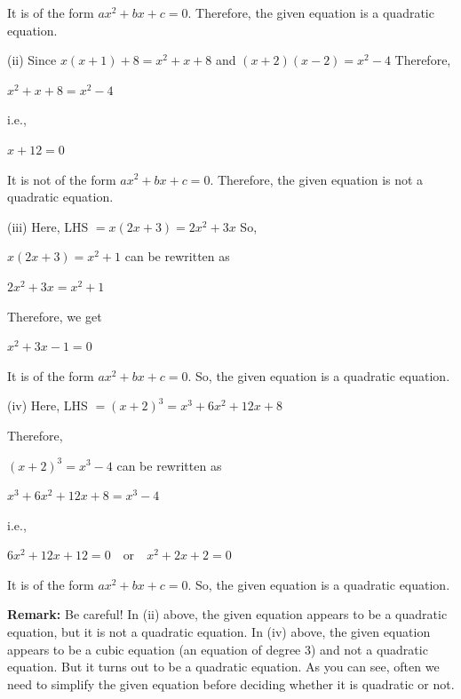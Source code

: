 \documentclass[11pt]{article}
\begin{document}
It is of the form $ax^2 + bx + c = 0$.
Therefore, the given equation is a quadratic equation.

\medskip
\noindent
(ii) Since $x(x + 1) + 8 = x^2 + x + 8$ and $(x + 2)(x - 2) = x^2 - 4$
Therefore,
\begin{center}
$x^2 + x + 8 = x^2 - 4$
\end{center}

i.e.,
\begin{center}
$x + 12 = 0$
\end{center}

It is not of the form $ax^2 + bx + c = 0$.
Therefore, the given equation is not a quadratic equation.

\medskip
\noindent
(iii) Here, \hspace{1cm} LHS $= x(2x + 3) = 2x^2 + 3x$
So,
\begin{center}
$x(2x + 3) = x^2 + 1$ can be rewritten as
\end{center}

\begin{center}
$2x^2 + 3x = x^2 + 1$
\end{center}
Therefore, we get
\begin{center}
$x^2 + 3x - 1 = 0$
\end{center}

It is of the form $ax^2 + bx + c = 0$.
So, the given equation is a quadratic equation.

\medskip
\noindent
(iv) Here, \hspace{1cm} LHS $= (x + 2)^3 = x^3 + 6x^2 + 12x + 8$

Therefore,
\begin{center}
$(x + 2)^3 = x^3 - 4$ can be rewritten as
\end{center}

\begin{center}
$x^3 + 6x^2 + 12x + 8 = x^3 - 4$
\end{center}

i.e.,
\begin{center}
$6x^2 + 12x + 12 = 0 \quad \text{or} \quad x^2 + 2x + 2 = 0$
\end{center}

It is of the form $ax^2 + bx + c = 0$.
So, the given equation is a quadratic equation.

\noindent\textcolor{chapterblue}{\textbf{Remark:}} Be careful! In (ii) above, the given equation appears to be a quadratic
equation, but it is not a quadratic equation. In (iv) above, the given equation appears to be a cubic equation (an equation of degree 3) and not a quadratic equation. But it turns out to be a quadratic equation. As you can see, often we need to simplify the given equation before deciding whether it is quadratic or not.
\end{document}
